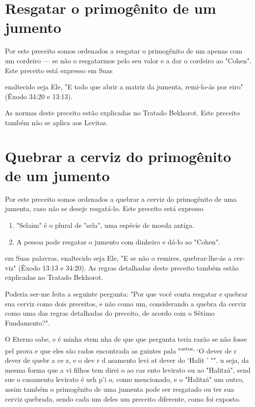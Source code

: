 \begin{itemize}
\begin{enumrate}
\begin{itemize}
\begin{itemize}
\section{Resgatar o primogênito de um jumento}


Por este preceito somos ordenados a resgatar o primogênito de um apenas
com um cordeiro --- se não o resgatarmos pelo seu valor e a dar o
cordeiro ao "Cohen". Este preceito está expresso em Suas


enaltecido seja Ele, "E todo que abrir a matriz da jumenta, remi-lo-ás
por eiro" (Êxodo 34:20 e 13:13).

As normas deste preceito estão explicadas no Tratado Bekhorot. Es­te
preceito também não se aplica aos Levitas.

\section{Quebrar a cerviz do primogênito de um jumento}

Por este preceito somos ordenados a quebrar a cerviz do primogê­nito de
uma jumenta, caso não se deseje resgatá-lo. Este preceito está expresso


\begin{enumerate}
\def\labelenumi{\arabic{enumi}.}
\setcounter{enumi}{102}
\item
 
 "Selaim" é o plural de "sela", uma espécie de moeda antiga.
 
\item
 
 A pessoa pode resgatar o jumento com dinheiro e dá-lo ao "Cohen".
 
\end{enumerate}

em Suas palavras, enaltecido seja Ele, "E se não o remires,
quebrar-lhe-ás a cer­viz" (Êxodo 13:13 e 34:20). As regras detalhadas
deste preceito também estão explicadas no Tratado Bekhorot.

Poderia ser-me feita a seguinte pergunta: "Por que você conta resga­tar
e quebrar sua cerviz como dois preceitos, e não como um, considerando a
quebra da cerviz como uma das regras detalhadas do preceito, de acordo
com o Sétimo Fundamento?".

O Eterno sabe, e é minha stem nha de que que pergunta teria razão se não
fosse pel prova e que eles são rados encontrada as guintes pala
\textsuperscript{rastos,} `O dever de r dever de quebr a ce z, e o dev r
d asamento levi at dever do `Halit ' "". u seja, da mesma forma que a vi
filhos tem direi o ao cas ento levirato ou ao "Halitzá", send sue o
casamen­to levirato é urh p'i o, como mencionado, e o "Halitzá" um
outro, assim também o primogênito de uma jumenta pode ser resgatado ou
ter sua cerviz quebrada, sendo cada um deles um preceito diferente, como
foi exposto.


\end{itemize}
\end{itemize}
\end{enumrate}
\end{itemize}
